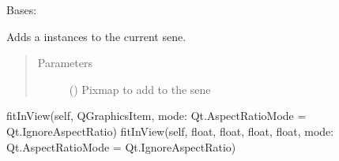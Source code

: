 \documentclass[letterpaper,10pt,english]{sphinxmanual}
\begin{document}

\begin{fulllineitems}
\label{\detokenize{polo.widgets:polo.widgets.slideshow_viewer.PhotoViewer}}
Bases: 

\begin{fulllineitems}
\label{\detokenize{polo.widgets:polo.widgets.slideshow_viewer.PhotoViewer.add_pixmap}}
Adds a  instances to the current sene.
\begin{quote}\begin{description}
\item[{Parameters}] \leavevmode
{} () \textendash{} Pixmap to add to the sene

\end{description}\end{quote}

\end{fulllineitems}


\begin{fulllineitems}
\label{\detokenize{polo.widgets:polo.widgets.slideshow_viewer.PhotoViewer.fitInView}}
fitInView(self, QGraphicsItem, mode: Qt.AspectRatioMode = Qt.IgnoreAspectRatio)
fitInView(self, float, float, float, float, mode: Qt.AspectRatioMode = Qt.IgnoreAspectRatio)

\end{fulllineitems}


\end{fulllineitems}
\end{document}
